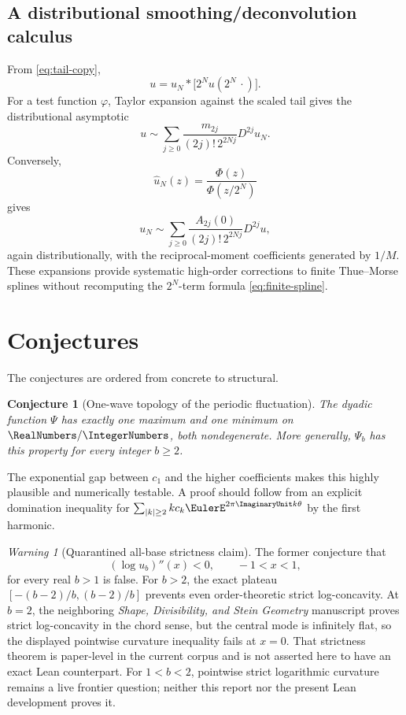 \documentclass[11pt,oneside]{article}
\newtheorem{conjecture}[theorem]{Conjecture}
\theoremstyle{definition}
\theoremstyle{remark}
\newtheorem{warning}[theorem]{Warning}
\begin{document}
\subsection{A distributional smoothing/deconvolution calculus}

From \eqref{eq:tail-copy},
\begin{equation}
 u=u_N*\bigl[2^Nu(2^N\,\cdot)\bigr].
 \label{eq:smoothing}
\end{equation}
For a test function \(\varphi\), Taylor expansion against the scaled tail
gives the distributional asymptotic
\begin{equation}
 u
 \sim
 \sum_{j\geq0}
 \frac{m_{2j}}{(2j)!\,2^{2Nj}}D^{2j}u_N.
 \label{eq:smoothing-expansion}
\end{equation}
Conversely,
\[
 \widehat u_N(z)=\frac{\Phi(z)}{\Phi(z/2^N)}
\]
gives
\begin{equation}
 u_N
 \sim
 \sum_{j\geq0}
 \frac{A_{2j}(0)}{(2j)!\,2^{2Nj}}D^{2j}u,
 \label{eq:deconvolution-expansion}
\end{equation}
again distributionally, with the reciprocal-moment coefficients generated
by \(1/M\).  These expansions provide systematic high-order corrections to
finite Thue--Morse splines without recomputing the \(2^N\)-term formula
\eqref{eq:finite-spline}.

\section{Conjectures}

The conjectures are ordered from concrete to structural.

\begin{conjecture}[One-wave topology of the periodic fluctuation]
\label{conj:one-wave}
The dyadic function \(\Psi\) has exactly one maximum and one minimum on
\(\RealNumbers/\IntegerNumbers\), both nondegenerate.  More generally, \(\Psi_b\) has this property
for every integer \(b\geq2\).
\end{conjecture}

The exponential gap between \(c_1\) and the higher coefficients makes this
highly plausible and numerically testable.  A proof should follow from an
explicit domination inequality for \(\sum_{|k|\geq2}k c_k\EulerE^{2\pi\ImaginaryUnit
k\theta}\) by the first harmonic.

\begin{warning}[Quarantined all-base strictness claim]
\label{warn:strict-logconcavity}
The former conjecture that
\[
 (\log u_b)''(x)<0,\qquad -1<x<1,
\]
for every real \(b>1\) is false.  For \(b>2\), the exact plateau
\([-(b-2)/b,(b-2)/b]\) prevents even order-theoretic strict
log-concavity.  At \(b=2\), the neighboring
\emph{Shape, Divisibility, and Stein Geometry} manuscript proves strict
log-concavity in the chord sense, but the central mode is infinitely flat, so
the displayed pointwise curvature inequality fails at \(x=0\).  That
strictness theorem is paper-level in the current corpus and is not asserted
here to have an exact Lean counterpart.  For \(1<b<2\), pointwise strict
logarithmic curvature remains a live frontier question; neither this report
nor the present Lean development proves it.
\end{warning}
\end{document}
